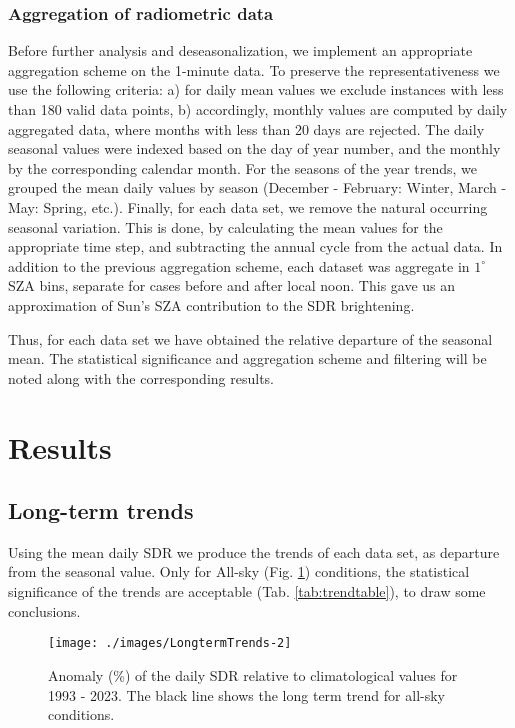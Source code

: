\documentclass[preprint, 3p,
authoryear]{elsarticle} %
\begin{document}
\hypertarget{aggregation-of-radiometric-data}{%
\subsubsection{Aggregation of radiometric
data}\label{aggregation-of-radiometric-data}}

Before further analysis and deseasonalization, we implement an
appropriate aggregation scheme on the 1-minute data. To preserve the
representativeness we use the following criteria: a) for daily mean
values we exclude instances with less than 180 valid data points, b)
accordingly, monthly values are computed by daily aggregated data, where
months with less than 20 days are rejected. The daily seasonal values
were indexed based on the day of year number, and the monthly by the
corresponding calendar month. For the seasons of the year trends, we
grouped the mean daily values by season (December - February: Winter,
March - May: Spring, etc.). Finally, for each data set, we remove the
natural occurring seasonal variation. This is done, by calculating the
mean values for the appropriate time step, and subtracting the annual
cycle from the actual data. In addition to the previous aggregation
scheme, each dataset was aggregate in \(1^\circ\) SZA bins, separate for
cases before and after local noon. This gave us an approximation of
Sun's SZA contribution to the SDR brightening.

Thus, for each data set we have obtained the relative departure of the
seasonal mean. The statistical significance and aggregation scheme and
filtering will be noted along with the corresponding results.

\hypertarget{results}{%
\section{Results}\label{results}}

\hypertarget{long-term-trends}{%
\subsection{Long-term trends}\label{long-term-trends}}

Using the mean daily SDR we produce the trends of each data set, as
departure from the seasonal value. Only for All-sky (Fig.
\ref{fig:trendALL}) conditions, the statistical significance of the
trends are acceptable (Tab. \ref{tab:trendtable}), to draw some
conclusions.

\begin{figure}[h!]

{\centering \texttt{[image: ./images/LongtermTrends-2]} 

}

\caption{Anomaly (\%) of the daily SDR relative to climatological values for 1993 - 2023. The black line shows the long term trend for all-sky conditions.}\label{fig:trendALL}
\end{figure}
\end{document}
